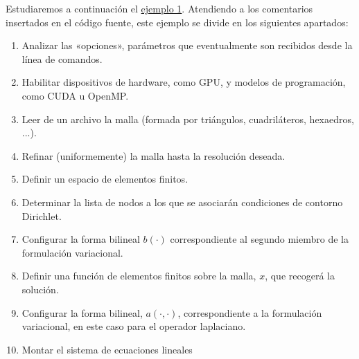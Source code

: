 Estudiaremos a continuación el
\href{https://github.com/mfem/mfem/blob/master/examples/ex1.cpp}{ejemplo
  1}. Atendiendo a los comentarios insertados en el código fuente,
este ejemplo se divide en los siguientes apartados:
\begin{enumerate}
\item Analizar las «opciones», parámetros que eventualmente son
  recibidos desde la línea de comandos.
\item Habilitar dispositivos de hardware, como GPU, y modelos de
  programación, como CUDA u OpenMP.
\item Leer de un archivo la malla (formada por triángulos,
  cuadriláteros, hexaedros, ...).
\item Refinar (uniformemente) la malla hasta la resolución deseada.
\item Definir un espacio de elementos finitos.
\item Determinar la lista de nodos a los que se asociarán condiciones
  de contorno Dirichlet.
\item Configurar la forma bilineal $b(\cdot)$ correspondiente al
  segundo miembro de la formulación variacional.
\item Definir una función de elementos finitos sobre la malla, $x$,
  que recogerá la solución.
\item Configurar la forma bilineal, $a(\cdot,\cdot)$, correspondiente
  a la formulación variacional, en este caso para el operador laplaciano.
\item Montar el sistema de ecuaciones lineales
\end{enumerate}

